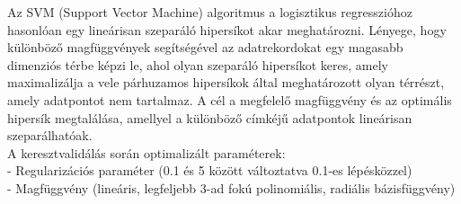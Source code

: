 \documentclass[12pt]{article}
\begin{document}
Az SVM (Support Vector Machine) algoritmus a logisztikus regresszióhoz hasonlóan egy lineárisan szeparáló hipersíkot akar meghatározni\cite{svm}. Lényege, hogy különböző magfüggvények segítségével az adatrekordokat egy magasabb dimenziós térbe képzi le, ahol olyan szeparáló hipersíkot keres, amely maximalizálja a vele párhuzamos hipersíkok által meghatározott olyan térrészt, amely adatpontot nem tartalmaz. A cél a megfelelő magfüggvény és az optimális hipersík megtalálása, amellyel a különböző címkéjű adatpontok lineárisan szeparálhatóak. \\

\noindent A keresztvalidálás során optimalizált paraméterek: \\
- Regularizációs paraméter (0.1 és 5 között változtatva 0.1-es lépésközzel)\\
- Magfüggvény (lineáris, legfeljebb 3-ad fokú polinomiális, radiális bázisfüggvény)



%
%
%
\end{document}
